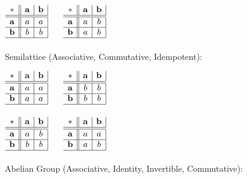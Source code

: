 $\begin{array}{c||c|c|}
  * & \mathbf{a} & \mathbf{b} \\ \hline \hline
  \mathbf{a} & a & a \\ \hline
  \mathbf{b} & b & b \\ \hline
\end{array}$ $\quad$ $\begin{array}{c||c|c|}
  * & \mathbf{a} & \mathbf{b} \\ \hline \hline
  \mathbf{a} & a & b \\ \hline
  \mathbf{b} & a & b \\ \hline
\end{array}$
\\ \\
Semilattice (Associative, Commutative, Idempotent):

$\begin{array}{c||c|c|}
  * & \mathbf{a} & \mathbf{b} \\ \hline \hline
  \mathbf{a} & a & a \\ \hline
  \mathbf{b} & a & a \\ \hline
\end{array}$ $\quad$ $\begin{array}{c||c|c|}
  * & \mathbf{a} & \mathbf{b} \\ \hline \hline
  \mathbf{a} & b & b \\ \hline
  \mathbf{b} & b & b \\ \hline
\end{array}$ \\ \hfill \\

$\begin{array}{c||c|c|}
  * & \mathbf{a} & \mathbf{b} \\ \hline \hline
  \mathbf{a} & a & b \\ \hline
  \mathbf{b} & b & b \\ \hline
\end{array}$ $\quad$ $\begin{array}{c||c|c|}
  * & \mathbf{a} & \mathbf{b} \\ \hline \hline
  \mathbf{a} & a & a \\ \hline
  \mathbf{b} & a & b \\ \hline
\end{array}$
\\ \\
Abelian Group (Associative, Identity, Invertible, Commutative):

